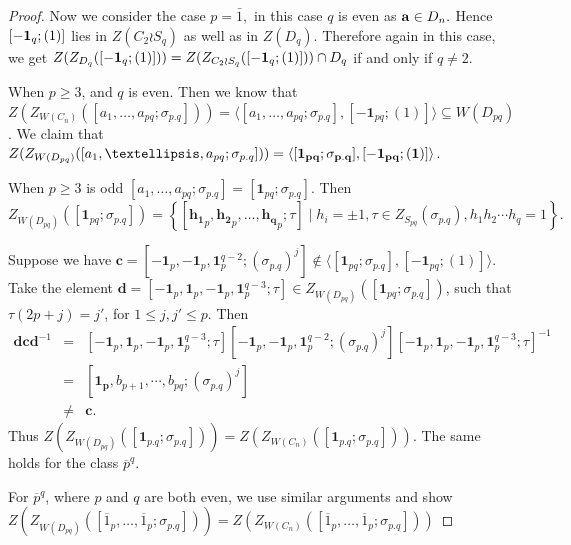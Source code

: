 \documentclass[12pt,twoside,reqno]{amsart}
\theoremstyle{definition}
\numberwithin{equation}{section}
\newcommand{\bmf}[1]{\mathbf{#1}}
\begin{document}
\begin{proof}
 Now we consider the case $p=\bar{1},$ in this case $q$ is even as ${\bf a}\in D_n.$ Hence $[{\bf -1}_q;(1)]$ lies in  $Z(C_2\wr S_q)$ as well as in $Z(D_q).$ Therefore again in this case, we get 
 $Z(Z_{D_q}([{\bf -1}_q;(1)]) )=Z(Z_{C_2\wr S_q}([{\bf -1}_q;(1)])) \cap D_q$ if and only if $q\neq 2.$ 
 
When $p \geq 3$, and $q$ is even. Then we know that $Z(Z_{W(C_n)}([a_1,\ldots,a_{pq}; \sigma_{p.q}])) = \langle [a_1,\ldots,a_{pq}; \sigma_{p.q}], [\bmf{-1}_{pq}; (1)] \rangle \subseteq W(D_{pq})$. We claim that $Z(Z_{W(D_{pq})}([a_1,\ldots,a_{pq}; \sigma_{p.q}])) = \langle [\bf{1}_{pq}; \sigma_{p.q}], [\bf{-1}_{pq}; (1)] \rangle$.

When $p \geq 3$ is odd $[a_1,\ldots,a_{pq}; \sigma_{p.q}] = [\bmf{1}_{pq}; \sigma_{p.q}]$. Then $$Z_{W(D_{pq})}([\bmf{1}_{pq}; \sigma_{p.q}]) =\left\{ [\bmf{h_1}_p,\bmf{h_2}_p,\ldots, \bmf{h_q}_p;\tau]\mid h_i = \pm1, \tau\in Z_{S_{pq}}(\sigma_{p.q}), h_1 h_2\cdots h_q = 1\right\}. $$

Suppose we have $\bmf{c} = [-\bmf{1}_p, -\bmf{1}_p, \bmf{1}^{q-2}_p; (\sigma_{p.q})^j] \notin \langle [\bmf{1}_{pq}; \sigma_{p.q}], [-\bmf{1}_{pq}; (1)]\rangle$. Take the element $\bmf{d} = [-\bmf{1}_p, \bmf{1}_p, -\bmf{1}_p, \bmf{1}^{q-3}_p; \tau] \in Z_{W(D_{pq})}([\bmf{1}_{pq}; \sigma_{p.q}])$, such that $\tau (2p +j) = j'$, for $1\leq j ,j'\leq p$. Then \begin{eqnarray*}\bmf{dcd}^{-1} &=& [-\bmf{1}_p, \bmf{1}_p, -\bmf{1}_p, \bmf{1}^{q-3}_p; \tau][-\bmf{1}_p, -\bmf{1}_p, \bmf{1}^{q-2}_p; (\sigma_{p.q})^j][-\bmf{1}_p, \bmf{1}_p, -\bmf{1}_p, \bmf{1}^{q-3}_p; \tau]^{-1}\\ &=& [\bmf{1_p},b_{p+1},\cdots, b_{pq} ;(\sigma_{p.q})^j]\\
&\neq& \bmf{c}.
\end{eqnarray*}
Thus $Z(Z_{W(D_{pq})}([\bmf{1}_{p.q}; \sigma_{p.q}])) = Z(Z_{W(C_n)}([\bmf{1}_{p.q}; \sigma_{p.q}]))$. The same holds for the class $\overline{p}^q$.

For $\overline{p}^q$, where $p$ and $q$ are both even, we use similar arguments and show $Z(Z_{W(D_{pq})}([\overline{1}_{p},\ldots,\overline{1}_p; \sigma_{p.q}])) = Z(Z_{W(C_n)}([\overline{1}_{p},\ldots,\overline{1}_p; \sigma_{p.q}]))$
\end{proof}
\end{document}
